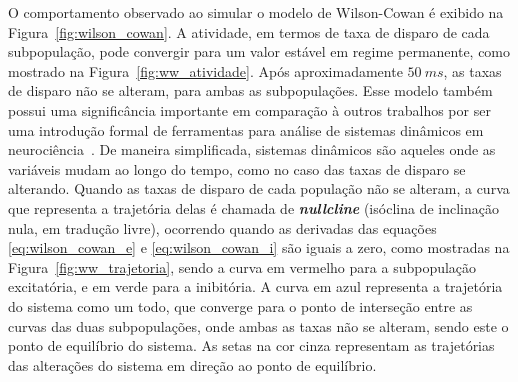O comportamento observado ao simular o modelo de Wilson-Cowan é exibido na Figura~\ref{fig:wilson_cowan}. A atividade, em termos de taxa de disparo de cada subpopulação, pode convergir para um valor estável em regime permanente, como mostrado na Figura~\ref{fig:ww_atividade}. Após aproximadamente $50\ ms$, as taxas de disparo não se alteram, para ambas as subpopulações. Esse modelo também possui uma significância importante em comparação à outros trabalhos por ser uma introdução formal de ferramentas para análise de sistemas dinâmicos em neurociência~\cite{ramezanian-panahi_generative_2022}. De maneira simplificada, sistemas dinâmicos são aqueles onde as variáveis mudam ao longo do tempo, como no caso das taxas de disparo se alterando. Quando as taxas de disparo de cada população não se alteram, a curva que representa a trajetória delas é chamada de \textbf{\textit{nullcline}} (isóclina de inclinação nula, em tradução livre), ocorrendo quando as derivadas das equações \ref{eq:wilson_cowan_e} e \ref{eq:wilson_cowan_i} são iguais a zero, como mostradas na Figura~\ref{fig:ww_trajetoria}, sendo a curva em vermelho para a subpopulação excitatória, e em verde para a inibitória. A curva em azul representa a trajetória do sistema como um todo, que converge para o ponto de interseção entre as curvas das duas subpopulações, onde ambas as taxas não se alteram, sendo este o ponto de equilíbrio do sistema. As setas na cor cinza representam as trajetórias das alterações do sistema em direção ao ponto de equilíbrio.
